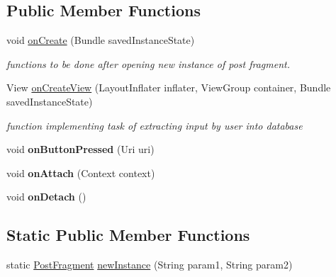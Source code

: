 \subsection*{Public Member Functions}
\begin{DoxyCompactItemize}
\item 
void \hyperlink{classcom_1_1example_1_1sel_1_1lostfound_1_1PostFragment_a6ae53f1d4250edd39b3fab572b34a03c}{on\+Create} (Bundle saved\+Instance\+State)\hypertarget{classcom_1_1example_1_1sel_1_1lostfound_1_1PostFragment_a6ae53f1d4250edd39b3fab572b34a03c}{}\label{classcom_1_1example_1_1sel_1_1lostfound_1_1PostFragment_a6ae53f1d4250edd39b3fab572b34a03c}

\begin{DoxyCompactList}\small\item\em functions to be done after opening new instance of post fragment. \end{DoxyCompactList}\item 
View \hyperlink{classcom_1_1example_1_1sel_1_1lostfound_1_1PostFragment_a8c10184073835d28affa07720db256a4}{on\+Create\+View} (Layout\+Inflater inflater, View\+Group container, Bundle saved\+Instance\+State)
\begin{DoxyCompactList}\small\item\em function implementing task of extracting input by user into database \end{DoxyCompactList}\item 
void {\bfseries on\+Button\+Pressed} (Uri uri)\hypertarget{classcom_1_1example_1_1sel_1_1lostfound_1_1PostFragment_afba287683734ca9acaea52278c3e1eb5}{}\label{classcom_1_1example_1_1sel_1_1lostfound_1_1PostFragment_afba287683734ca9acaea52278c3e1eb5}

\item 
void {\bfseries on\+Attach} (Context context)\hypertarget{classcom_1_1example_1_1sel_1_1lostfound_1_1PostFragment_af8646c233bb3c70dbb6352f8a1c60e62}{}\label{classcom_1_1example_1_1sel_1_1lostfound_1_1PostFragment_af8646c233bb3c70dbb6352f8a1c60e62}

\item 
void {\bfseries on\+Detach} ()\hypertarget{classcom_1_1example_1_1sel_1_1lostfound_1_1PostFragment_ae96f353335b113be26870d00d3ac3b1c}{}\label{classcom_1_1example_1_1sel_1_1lostfound_1_1PostFragment_ae96f353335b113be26870d00d3ac3b1c}

\end{DoxyCompactItemize}
\subsection*{Static Public Member Functions}
\begin{DoxyCompactItemize}
\item 
static \hyperlink{classcom_1_1example_1_1sel_1_1lostfound_1_1PostFragment}{Post\+Fragment} \hyperlink{classcom_1_1example_1_1sel_1_1lostfound_1_1PostFragment_a7350f5b81aa9144d9acdeca902676773}{new\+Instance} (String param1, String param2)
\end{DoxyCompactItemize}
